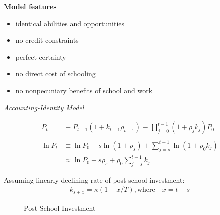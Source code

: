 \begin{frame}\textbf{Model features}\vspace{0.3cm}
\begin{itemize}\setlength\itemsep{1em}
\item identical abilities and opportunities
\item no credit constraints
\item perfect certainty
\item no direct cost of schooling
\item no nonpecuniary benefits of school and work
\end{itemize}
\end{frame}
\begin{frame}\begin{center}
\LARGE\textit{Accounting-Identity Model}
\end{center}\end{frame}
\begin{frame}
\begin{align*}
P_t & \equiv P_{t - 1} (1 + k_{t - 1} \rho_{t - 1}) \equiv \prod^{t - 1}_{j= 0} (1 + \rho_jk_j)P_0 \\
& \\
\ln{P_t} & \equiv \ln{P_0}  + s \ln{(1 + \rho_s)} + \sum^{t-1}_{j=s} \ln{(1 + \rho_0 k_j)} \\
& \approx  \ln{P_0} + s \rho_s + \rho_0 \sum^{t - 1}_{j=s} k_j
\end{align*}
\end{frame}
\begin{frame}
Assuming linearly declining rate of post-school investment:
\begin{align*}
k_{s + x} = \kappa\left( 1 - x/T\right),\text{where} \quad x = t - s
\end{align*}
\end{frame}
\begin{frame}
\begin{figure}[htp]\centering
\caption{Post-School Investment}
\end{figure}
\end{frame}
